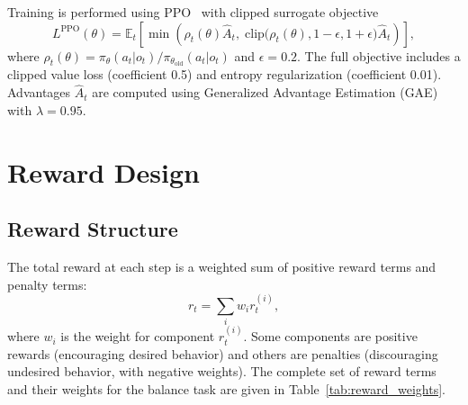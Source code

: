 \documentclass[conference]{IEEEtran}
\begin{document}
Training is performed using PPO~\cite{ppo} with clipped surrogate objective
\begin{equation}
L^{\mathrm{PPO}}(\theta) =
\mathbb{E}_t\left[
\min\left(
\rho_t(\theta)\hat{A}_t,\;
\mathrm{clip}\big(\rho_t(\theta), 1-\epsilon, 1+\epsilon\big)\hat{A}_t
\right)
\right],
\end{equation}
where $\rho_t(\theta)=\pi_\theta(a_t|o_t)/\pi_{\theta_{\mathrm{old}}}(a_t|o_t)$ and $\epsilon=0.2$. The full objective includes a clipped value loss (coefficient 0.5) and entropy regularization (coefficient 0.01). Advantages $\hat{A}_t$ are computed using Generalized Advantage Estimation (GAE)~\cite{gae} with $\lambda=0.95$.

\section{Reward Design}
\label{sec:reward}

\subsection{Reward Structure}
The total reward at each step is a weighted sum of positive reward terms and penalty terms:
\begin{equation}
r_t = \sum_i w_i r_t^{(i)},
\label{eq:reward_total}
\end{equation}
where $w_i$ is the weight for component $r_t^{(i)}$. Some components are positive rewards (encouraging desired behavior) and others are penalties (discouraging undesired behavior, with negative weights). The complete set of reward terms and their weights for the balance task are given in Table~\ref{tab:reward_weights}.
\end{document}

